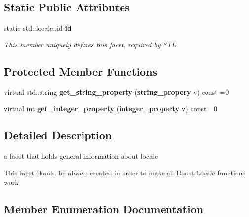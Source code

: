 \subsection*{Static Public Attributes}
\begin{DoxyCompactItemize}
\item 
static std\+::locale\+::id {\bf id}\label{classbooster_1_1locale_1_1info_aa3300572409ad20043a3ad629aa761df}

\begin{DoxyCompactList}\small\item\em This member uniquely defines this facet, required by S\+TL. \end{DoxyCompactList}\end{DoxyCompactItemize}
\subsection*{Protected Member Functions}
\begin{DoxyCompactItemize}
\item 
virtual std\+::string {\bf get\+\_\+string\+\_\+property} ({\bf string\+\_\+propery} v) const =0
\item 
virtual int {\bf get\+\_\+integer\+\_\+property} ({\bf integer\+\_\+property} v) const =0
\end{DoxyCompactItemize}


\subsection{Detailed Description}
a facet that holds general information about locale 

This facet should be always created in order to make all Boost.\+Locale functions work 

\subsection{Member Enumeration Documentation}
